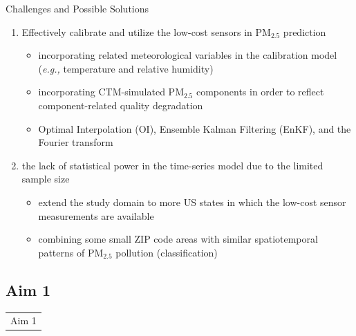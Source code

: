 \documentclass{beamer}
\begin{document}
\begin{frame}{Challenges and Possible Solutions}
    \begin{enumerate}
        \item Effectively calibrate and utilize the low-cost sensors in PM$_{2.5}$ prediction
            \begin{itemize}
                \item \textcolor[rgb]{0.1,0.1,0.6}{incorporating related meteorological variables in the calibration model (\textit{e.g.,} temperature and relative humidity)}
                \item \textcolor[rgb]{0.1,0.1,0.6}{incorporating CTM-simulated PM$_{2.5}$ components in order to reflect component-related quality degradation}
                \item \textcolor[rgb]{0.1,0.1,0.6}{Optimal Interpolation (OI), Ensemble Kalman Filtering (EnKF), and the Fourier transform}
            \end{itemize}
        \item the lack of statistical power in the time-series model due to the limited sample size
            \begin{itemize}
                \item \textcolor[rgb]{0.1,0.1,0.6}{extend the study domain to more US states in which the low-cost sensor measurements are available}
                \item \textcolor[rgb]{0.1,0.1,0.6}{combining some small ZIP code areas with similar spatiotemporal patterns of PM$_{2.5}$ pollution (classification)}
            \end{itemize}
    \end{enumerate}
\end{frame}


\subsection*{Aim 1}

\begin{frame}{}
    \begin{table}
        \LARGE
        \centering
        \begin{tabular}{c}
             \textcolor[rgb]{0.1,0.1,0.6}{Aim 1}
        \end{tabular}
    \end{table}
\end{frame}
\end{document}
